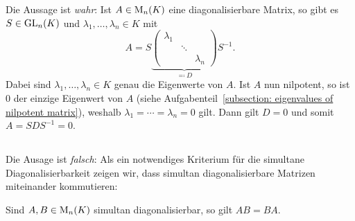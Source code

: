 Die Aussage ist \emph{wahr}:
Ist $A \in \operatorname{M}_{n}(K)$ eine diagonalisierbare Matrix, so gibt es $S \in \operatorname{GL}_{n}(K)$ und $\lambda_1, \dotsc, \lambda_n \in K$ mit
\[
    A
  = S
    \underbrace{
    \begin{pmatrix}
      \lambda_1 &         &           \\
                & \ddots  &           \\
                &         & \lambda_n
    \end{pmatrix}
    }_{ \eqqcolon D}
    S^{-1}.
\]
Dabei sind $\lambda_1, \dotsc, \lambda_n \in K$ genau die Eigenwerte von $A$.
Ist $A$ nun nilpotent, so ist $0$ der einzige Eigenwert von $A$ (siehe Aufgabenteil~\ref{subsection: eigenvalues of nilpotent matrix}), weshalb $\lambda_1 = \dotsb = \lambda_n = 0$ gilt.
Dann gilt $D = 0$ und somit $A = S D S^{-1} = 0$.





\subsection{}
\label{subsection: all diagonalizable matrices are simultaneously diagonalizable}

Die Ausage ist \emph{falsch}:
Als ein notwendiges Kriterium für die simultane Diagonalisierbarkeit zeigen wir, dass simultan diagonalisierbare Matrizen miteinander kommutieren:

\begin{lemma}
  \label{lemma: simultaneously diagonalizable matrices commute}
  Sind $A, B \in \operatorname{M}_{n}(K)$ simultan diagonalisierbar, so gilt $AB = BA$.
\end{lemma}

